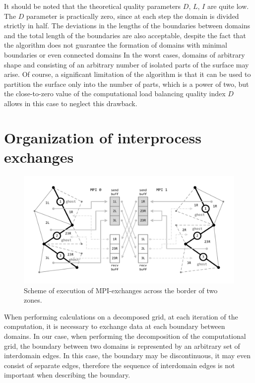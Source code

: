 \documentclass[
11pt,%
tightenlines,%
twoside,%
onecolumn,%
nofloats,%
nobibnotes,%
nofootinbib,%
superscriptaddress,%
noshowpacs,%
centertags]%
{revtex4}
\begin{document}
It should be noted that the theoretical quality parameters $ D $, $ L $, $ I $ are quite low.
The $ D $ parameter is practically zero, since at each step the domain is divided strictly in half.
The deviations in the lengths of the boundaries between domains and the total length of the boundaries are also acceptable, despite the fact that the algorithm does not guarantee the formation of domains with minimal boundaries or even connected domains
In the worst cases, domains of arbitrary shape and consisting of an arbitrary number of isolated parts of the surface may arise.
Of course, a significant limitation of the algorithm is that it can be used to partition the surface only into the number of parts, which is a power of two, but the close-to-zero value of the computational load balancing quality index $ D $ allows in this case to neglect this drawback.

\section{Organization of interprocess exchanges}

\begin{figure}[h]
\includegraphics[width=1.0\textwidth]{pics/04-MPI.pdf}
\caption{Scheme of execution of MPI-exchanges across the border of two zones.}\label{fig:04-MPI}
\end{figure}

When performing calculations on a decomposed grid, at each iteration of the computation, it is necessary to exchange data at each boundary between domains.
In our case, when performing the decomposition of the computational grid, the boundary between two domains is represented by an arbitrary set of interdomain edges.
In this case, the boundary may be discontinuous, it may even consist of separate edges, therefore the sequence of interdomain edges is not important when describing the boundary.
\end{document}
